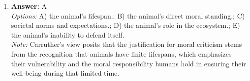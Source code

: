\documentclass[12pt]{article}
\begin{document}
\begin{enumerate}[label=\arabic*.]
\\ \textit{Options:} A) the postulate of immortality.; B) the autonomous will.; C) the categorical imperative.; D) legislating for oneself.; E) the unity of consciousness.
\\ \textit{Note:} Anscombe criticizes Kant's idea of legislating for oneself because she argues that moral laws should not be viewed as self-imposed commands but rather as objective standards that exist independently of individual will.
\item \textbf{Answer:} A
\\ \textit{Options:} A) the animal's lifespan.; B) the animal's direct moral standing.; C) societal norms and expectations.; D) the animal's role in the ecosystem.; E) the animal's inability to defend itself.
\\ \textit{Note:} Carruther's view posits that the justification for moral criticism stems from the recognition that animals have finite lifespans, which emphasizes their vulnerability and the moral responsibility humans hold in ensuring their well-being during that limited time.
\end{enumerate}
\end{document}
